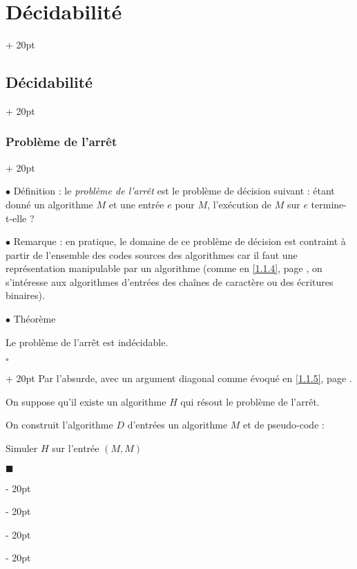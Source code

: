 \documentclass[a4paper, 12pt, twoside]{article}
\newenvironment{indalgo}[2][H]{
    \begin{algoBox}
        \begin{algorithm}[#1]
            \caption{#2}
}
{
        \end{algorithm}
    \end{algoBox}
}
\newcommand{\ind}[1][20pt]{\advance\leftskip + #1}
\newcommand{\deind}[1][20pt]{\advance\leftskip - #1}
\newenvironment{indt}[2][20pt]{#2 \par \ind[#1]}{\par \deind} %
\newenvironment{proof}[1][{}]{\begin{indt}{$\square$ #1}}{$\blacksquare$ \end{indt}}
\begin{document}
\begin{indt}{\section{Décidabilité}}
\begin{indt}{\subsection{Décidabilité}}
            \begin{indt}{\subsubsection{Problème de l'arrêt}}
                \label{1.2.4}

                $\bullet$ Définition : le \emph{problème de l'arrêt} est le problème de décision suivant : étant donné un algorithme $M$ et une entrée $e$ pour $M$, l'exécution de $M$ sur $e$ termine-t-elle ?

                \vspace{12pt}
                
                $\bullet$ Remarque : en pratique, le domaine de ce problème de décision est contraint à partir de l'ensemble des codes sources des algorithmes car il faut une représentation manipulable par un algorithme (comme en \ref{1.1.4}, page \pageref{1.1.4}, on s'intéresse aux algorithmes d'entrées des chaînes de caractère ou des écritures binaires).

                \vspace{12pt}
                
                $\bullet$ Théorème
                \begin{emphBox}
                    Le problème de l'arrêt est indécidable.
                \end{emphBox}

                \vspace{6pt}
                
                \begin{proof}
                    Par l'absurde, avec un argument diagonal comme évoqué en \ref{1.1.5}, page \pageref{1.1.5}.

                    On suppose qu'il existe un algorithme $H$ qui résout le problème de l'arrêt.

                    On construit l'algorithme $D$ d'entrées un algorithme $M$ et de pseudo-code :
                    \begin{indalgo}{$D$}
                        Simuler $H$ sur l'entrée $(M, M)$\;

                    \end{indalgo}


\end{proof}
\end{indt}
\end{indt}
\end{indt}
\end{document}
